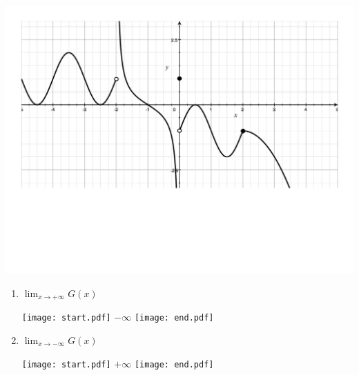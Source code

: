 \documentclass[12pt]{article}
\begin{document}
\begin{enumerate}
\begin{center}
\includegraphics[scale=0.5]{Limits3.pdf}
\end{center}

\begin{enumerate}

\item $\displaystyle \lim_{x \rightarrow +\infty}{G(x)}$

\texttt{[image: start.pdf]}
{{$-\infty$}}
\texttt{[image: end.pdf]}


\item $\displaystyle \lim_{x \rightarrow -\infty}{G(x)}$

\texttt{[image: start.pdf]}
{{$+\infty$}}
\texttt{[image: end.pdf]}


\end{enumerate}

\end{enumerate}

\end{document}
